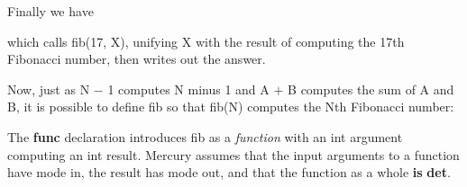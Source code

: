 \documentclass[a4paper,11pt,notitlepage,onecolumn]{book}
\begin{document}
Finally we have
\begin{small}

\begin{ptabular}
\nextline
{}
\nextline
{}
\nextline
{}
\nextline
{}
\nextline
\end{ptabular}

\end{small}
which calls \textsf{fib(17, X)}, unifying \textsf{X} with the result of computing the 17th
Fibonacci number, then writes out the answer.

Now, just as \textsf{N {\ensuremath{-}} 1} computes \textsf{N} minus 1 and \textsf{A {\ensuremath{+}} B} computes
the sum of \textsf{A} and \textsf{B}, it is possible to define \textsf{fib} so
that \textsf{fib(N)} computes the \textsf{N}th Fibonacci number:
\begin{small}

\begin{ptabular}
\nextline
\nextline
{}
\nextline
{}
\nextline
{}
\nextline
{}
\nextline
{}
\nextline
\end{ptabular}

\end{small}
The \textsf{\textbf{func}} declaration introduces \textsf{fib} as a \emph{function} with an \textsf{int}
argument computing an \textsf{int} result.  Mercury assumes that the input
arguments to a function have mode \textsf{in}, the result has mode \textsf{out}, and
that the function as a whole \textsf{\textbf{is} \textbf{det}}.
\end{document}
